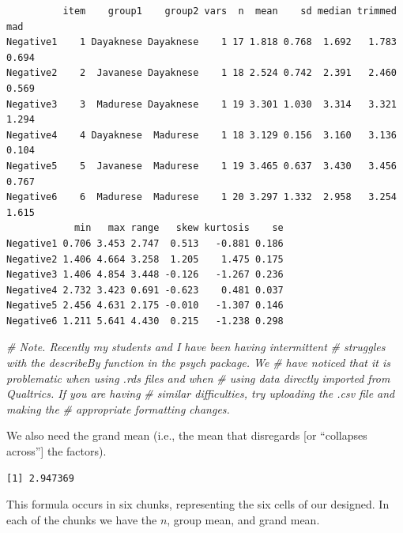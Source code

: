 \documentclass[
  11pt,
]{book}
\newenvironment{Shaded}{\begin{snugshade}}{\end{snugshade}}
\newcommand{\CommentTok}[1]{\textcolor[rgb]{0.56,0.35,0.01}{\textit{#1}}}
\newcommand{\FunctionTok}[1]{\textcolor[rgb]{0.00,0.00,0.00}{#1}}
\newcommand{\NormalTok}[1]{#1}
\newcommand{\SpecialCharTok}[1]{\textcolor[rgb]{0.00,0.00,0.00}{#1}}
\begin{document}
\begin{verbatim}
          item    group1    group2 vars  n  mean    sd median trimmed   mad
Negative1    1 Dayaknese Dayaknese    1 17 1.818 0.768  1.692   1.783 0.694
Negative2    2  Javanese Dayaknese    1 18 2.524 0.742  2.391   2.460 0.569
Negative3    3  Madurese Dayaknese    1 19 3.301 1.030  3.314   3.321 1.294
Negative4    4 Dayaknese  Madurese    1 18 3.129 0.156  3.160   3.136 0.104
Negative5    5  Javanese  Madurese    1 19 3.465 0.637  3.430   3.456 0.767
Negative6    6  Madurese  Madurese    1 20 3.297 1.332  2.958   3.254 1.615
            min   max range   skew kurtosis    se
Negative1 0.706 3.453 2.747  0.513   -0.881 0.186
Negative2 1.406 4.664 3.258  1.205    1.475 0.175
Negative3 1.406 4.854 3.448 -0.126   -1.267 0.236
Negative4 2.732 3.423 0.691 -0.623    0.481 0.037
Negative5 2.456 4.631 2.175 -0.010   -1.307 0.146
Negative6 1.211 5.641 4.430  0.215   -1.238 0.298
\end{verbatim}

\begin{Shaded}
\begin{Highlighting}[]
\CommentTok{\# Note. Recently my students and I have been having intermittent}
\CommentTok{\# struggles with the describeBy function in the psych package. We}
\CommentTok{\# have noticed that it is problematic when using .rds files and when}
\CommentTok{\# using data directly imported from Qualtrics. If you are having}
\CommentTok{\# similar difficulties, try uploading the .csv file and making the}
\CommentTok{\# appropriate formatting changes.}
\end{Highlighting}
\end{Shaded}

We also need the grand mean (i.e., the mean that disregards {[}or ``collapses across''{]} the factors).

\begin{Shaded}
\end{Shaded}

\begin{verbatim}
[1] 2.947369
\end{verbatim}

This formula occurs in six chunks, representing the six cells of our designed. In each of the chunks we have the \(n\), group mean, and grand mean.
\end{document}
